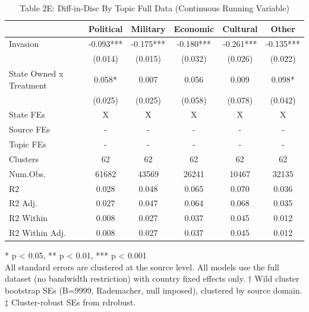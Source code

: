 \begin{table}[!t]
\caption{Table 2E: Diff-in-Disc By Topic Full Data (Continuous Running Variable)} 
\fontsize{12.0pt}{14.4pt}\selectfont
\begin{tabular*}{\linewidth}{@{\extracolsep{\fill}}lccccc}
\toprule
  & Political & Military & Economic & Cultural & Other \\ 
\midrule\addlinespace[2.5pt]
Invasion & -0.093*** & -0.175*** & -0.180*** & -0.261*** & -0.135*** \\ 
 & (0.014) & (0.015) & (0.032) & (0.026) & (0.022) \\ 
State Owned x Treatment & 0.058* & 0.007 & 0.056 & 0.009 & 0.098* \\ 
{} & {(0.025)} & {(0.025)} & {(0.058)} & {(0.078)} & {(0.042)} \\ 
State FEs & X & X & X & X & X \\ 
Source FEs & - & - & - & - & - \\ 
Topic FEs & - & - & - & - & - \\ 
Clusters & 62 & 62 & 62 & 62 & 62 \\ 
Num.Obs. & 61682 & 43569 & 26241 & 10467 & 32135 \\ 
R2 & 0.028 & 0.048 & 0.065 & 0.070 & 0.036 \\ 
R2 Adj. & 0.027 & 0.047 & 0.064 & 0.068 & 0.035 \\ 
R2 Within & 0.008 & 0.027 & 0.037 & 0.045 & 0.012 \\ 
R2 Within Adj. & 0.008 & 0.027 & 0.037 & 0.045 & 0.012 \\ 
\bottomrule
\end{tabular*}
\begin{minipage}{\linewidth}
* p < 0.05, ** p < 0.01, *** p < 0.001\\
All standard errors are clustered at the source level. All models use the full
dataset (no bandwidth restriction) with country fixed effects only. † Wild
cluster bootstrap SEs (B=9999, Rademacher, null imposed), clustered by source
domain. ‡ Cluster-robust SEs from rdrobust.\\
\end{minipage}
\end{table}

